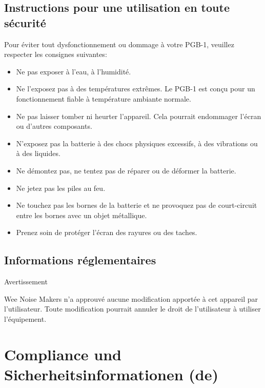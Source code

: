 \documentclass[8pt]{extarticle}
\begin{document}
\begin{multicols*}{3}
\subsection{Instructions pour une utilisation en toute sécurité}

Pour éviter tout dysfonctionnement ou dommage à votre PGB-1, veuillez respecter les consignes suivantes:
\begin{itemize}
\item Ne pas exposer à l'eau, à l'humidité.
\item Ne l'exposez pas à des températures extrêmes. Le PGB-1 est conçu pour un fonctionnement fiable à température ambiante normale.
\item Ne pas laisser tomber ni heurter l'appareil. Cela pourrait endommager l'écran ou d'autres composants.
\item N'exposez pas la batterie à des chocs physiques excessifs, à des vibrations ou à des liquides.
\item Ne démontez pas, ne tentez pas de réparer ou de déformer la batterie.
\item Ne jetez pas les piles au feu.
\item Ne touchez pas les bornes de la batterie et ne provoquez pas de court-circuit entre les bornes avec un objet métallique.
\item Prenez soin de protéger l'écran des rayures ou des taches.
\end{itemize}

\subsection{Informations réglementaires}

Avertissement

Wee Noise Makers n'a approuvé aucune modification apportée à cet appareil par l'utilisateur. Toute modification pourrait annuler le droit de l'utilisateur à utiliser l'équipement.

\vfill\null
\columnbreak

\section{Compliance und Sicherheitsinformationen (de)}


\end{multicols*}
\end{document}
